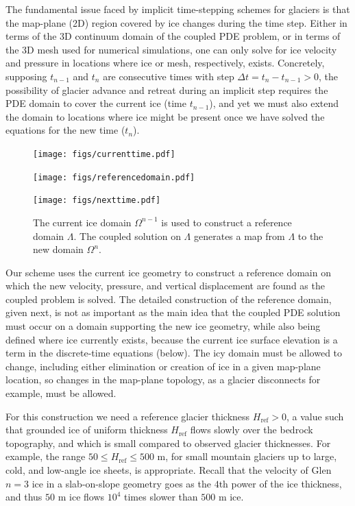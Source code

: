 \documentclass[letterpaper,final,12pt,reqno]{amsart}
\newcommand{\Href}{H_{\text{ref}}}
\begin{document}
The fundamental issue faced by implicit time-stepping schemes for glaciers is that the map-plane (2D) region covered by ice changes during the time step.  Either in terms of the 3D continuum domain of the coupled PDE problem, or in terms of the 3D mesh used for numerical simulations, one can only solve for ice velocity and pressure in locations where ice or mesh, respectively, exists.  Concretely, supposing $t_{n-1}$ and $t_n$ are consecutive times with step $\Delta t = t_n - t_{n-1} > 0$, the possibility of glacier advance and retreat during an implicit step requires the PDE domain to cover the current ice (time $t_{n-1}$), and yet we must also extend the domain to locations where ice might be present once we have solved the equations for the new time ($t_n$).

\begin{figure}[ht]
\begin{center}
\texttt{[image: figs/currenttime.pdf]}
\vspace{-6mm}

\texttt{[image: figs/referencedomain.pdf]}
\vspace{-1mm}

\texttt{[image: figs/nexttime.pdf]}
\end{center}
\caption{The current ice domain $\Omega^{n-1}$ is used to construct a reference domain $\Lambda$.  The coupled solution on $\Lambda$ generates a map from $\Lambda$ to the new domain $\Omega^n$.}
\label{fig:domainupdate}
\end{figure}

Our scheme uses the current ice geometry to construct a reference domain on which the new velocity, pressure, and vertical displacement are found as the coupled problem is solved.  The detailed construction of the reference domain, given next, is not as important as the main idea that the coupled PDE solution must occur on a domain supporting the new ice geometry, while also being defined where ice currently exists, because the current ice surface elevation is a term in the discrete-time equations (below).  The icy domain must be allowed to change, including either elimination or creation of ice in a given map-plane location, so changes in the map-plane topology, as a glacier disconnects for example, must be allowed.

For this construction we need a reference glacier thickness $\Href>0$, a value such that grounded ice of uniform thickness $\Href$ flows slowly over the bedrock topography, and which is small compared to observed glacier thicknesses.  For example, the range $50 \le \Href \le 500$ m, for small mountain glaciers up to large, cold, and low-angle ice sheets, is appropriate.  Recall that the velocity of Glen $n=3$ ice in a slab-on-slope geometry \cite{GreveBlatter2009} goes as the $4$th power of the ice thickness, and thus $50$ m ice flows $10^4$ times slower than $500$ m ice.
\end{document}
